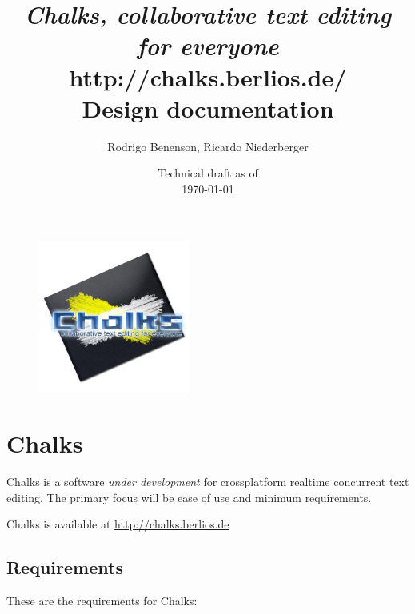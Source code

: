 \documentclass{report}
\title{\large \emph{Chalks, collaborative text editing for everyone} \\ http://chalks.berlios.de/ \\ \huge Design documentation}
\author{Rodrigo Benenson, Ricardo Niederberger}
\date{Technical draft as of\\ \today}
\begin{document}
\begin{figure}[!t]
 \begin{center}
    \includegraphics[angle=0,width=5cm]{schemas/logo.jpg}
 \end{center}
\end{figure}


\maketitle
\thispagestyle{empty}

\newpage
\setcounter{page}{1}


\tableofcontents
\newpage
% 

\chapter{Chalks}


Chalks is a software \emph{under development} for crossplatform realtime concurrent text editing.
The primary focus will be ease of use and minimum requirements.


Chalks is available at \url{http://chalks.berlios.de}


\section{Requirements}

These are the requirements for Chalks:
\end{document}
